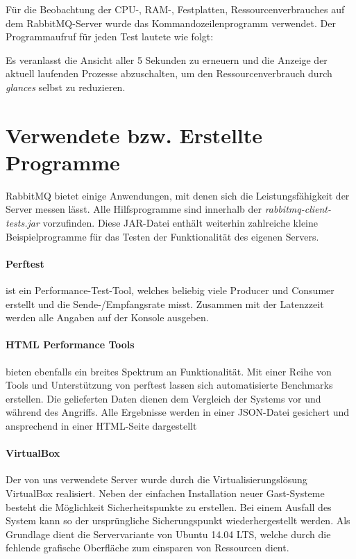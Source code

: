 \documentclass[	a4paper,
			11pt,
			titlepage,
			oneside,
			fleqn,
			listof=totoc,
			parskip,
			chapterprefix=false,
			numbers=noenddot]{scrreprt}
\begin{document}
	Für die Beobachtung der CPU-, RAM-, Festplatten, Ressourcenverbrauches auf dem RabbitMQ-Server wurde das Kommandozeilenprogramm  verwendet. Der Programmaufruf für jeden Test lautete wie folgt:
	\begin{quote}
	\end{quote}
	Es veranlasst die Ansicht aller 5 Sekunden zu erneuern und die Anzeige der aktuell laufenden Prozesse abzuschalten, um den Ressourcenverbrauch durch \textsl{glances} selbst zu reduzieren.
	
\clearpage
\section*{Verwendete bzw. Erstellte Programme}
	
	RabbitMQ bietet einige Anwendungen, mit denen sich die Leistungsfähigkeit der Server messen lässt. Alle Hilfsprogramme sind innerhalb der \textit{rabbitmq-client-tests.jar} vorzufinden. Diese JAR-Datei enthält weiterhin zahlreiche kleine Beispielprogramme für das Testen der Funktionalität des eigenen Servers. 
	
	\paragraph{Perftest} ist ein Performance-Test-Tool, welches beliebig viele Producer und Consumer erstellt und die Sende-/Empfangsrate misst. Zusammen mit der Latenzzeit werden alle Angaben auf der Konsole ausgeben.

	\paragraph{HTML Performance Tools} bieten ebenfalls ein breites Spektrum an Funktionalität. Mit einer Reihe von Tools und Unterstützung von perftest lassen sich automatisierte Benchmarks erstellen. Die gelieferten Daten dienen dem Vergleich der Systems vor und während des Angriffs. Alle Ergebnisse werden in einer JSON-Datei gesichert und ansprechend in einer HTML-Seite dargestellt

	\paragraph{VirtualBox} Der von uns verwendete Server wurde durch die Virtualisierungslösung VirtualBox realisiert. Neben der einfachen Installation neuer Gast-Systeme besteht die Möglichkeit Sicherheitspunkte zu erstellen. Bei einem Ausfall des System kann so der ursprüngliche Sicherungspunkt wiederhergestellt werden. Als Grundlage dient die Servervariante von Ubuntu 14.04 LTS, welche durch die fehlende grafische Oberfläche zum einsparen von Ressourcen dient.
\end{document}
